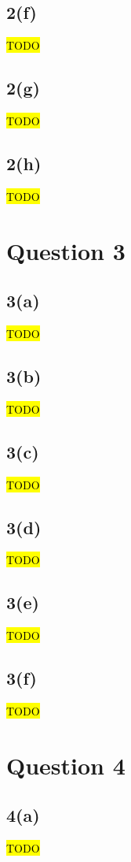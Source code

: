 \documentclass[12pt, a4paper,reqno]{article}
\begin{document}
\subsection*{2(f)}
\hl{TODO}

\subsection*{2(g)}
\hl{TODO}

\subsection*{2(h)}
\hl{TODO}


%
%
\clearpage\section*{Question 3}

\subsection*{3(a)}
\hl{TODO}

\subsection*{3(b)}
\hl{TODO}

\subsection*{3(c)}
\hl{TODO}

\subsection*{3(d)}
\hl{TODO}

\subsection*{3(e)}
\hl{TODO}

\subsection*{3(f)}
\hl{TODO}


%
%
\clearpage\section*{Question 4}

\subsection*{4(a)}
\hl{TODO}
\end{document}
